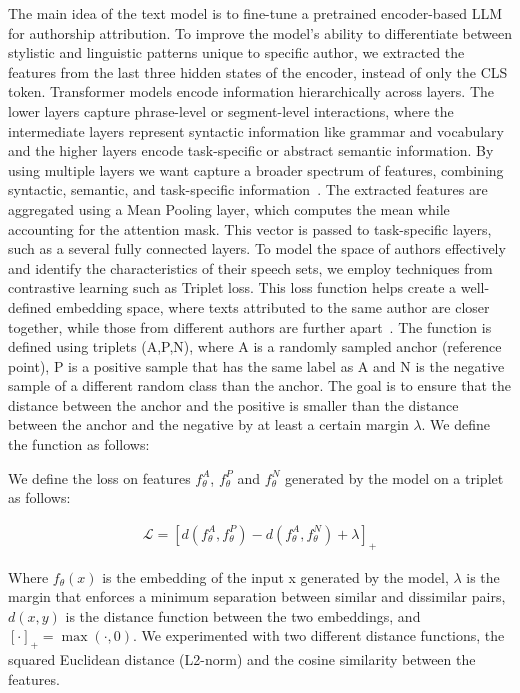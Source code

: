 \documentclass{Interspeech}
\begin{document}
The main idea of the text model is to fine-tune a pretrained encoder-based LLM
for authorship attribution. To improve the model's ability to differentiate
between stylistic and linguistic patterns unique to specific author, we
extracted the features from the last three hidden states of the encoder,
instead of only the CLS token. Transformer models encode information
hierarchically across layers. The lower layers capture phrase-level or
segment-level interactions, where the intermediate layers represent syntactic
information like grammar and vocabulary and the higher layers encode
task-specific or abstract semantic information. By using multiple layers we
want capture a broader spectrum of features, combining syntactic, semantic, and
task-specific information~\cite{jawahar2019does}. The extracted features are
aggregated using a Mean Pooling layer, which computes the mean while accounting
for the attention mask. This vector is passed to task-specific layers, such as
a several fully connected layers. To model the space of authors effectively and
identify the characteristics of their speech sets, we employ techniques from
contrastive learning such as Triplet loss. This loss function helps create a
well-defined embedding space, where texts attributed to the same author are
closer together, while those from different authors are further
apart~\cite{mao2019metric}. The function is defined using triplets (A,P,N),
where A is a randomly sampled anchor (reference point), P is a positive sample
that has the same label as A and N is the negative sample of a different random
class than the anchor. The goal is to ensure that the distance between the
anchor and the positive is smaller than the distance between the anchor and the
negative by at least a certain margin $\lambda$. We define the function as follows:

We define the loss on features $f_\theta^{A}$, $f_\theta^{P}$ and $f_\theta^{N}$ generated by the model on a triplet as follows:

\begin{align}
  \mathcal{L} = [d(f_\theta^{A},f_\theta^{P}) - d(f_\theta^{A},f_\theta^{N}) + \lambda]_{+}
  \label{eq:triplet_loss}
\end{align}


Where $f_\theta(x)$ is the embedding of the input x generated by the model,
$\lambda$ is the margin that enforces a minimum separation between similar and
dissimilar pairs, $d(x,y)$ is the distance function between the two embeddings,
and $[\cdot]_{+} = \max(\cdot, 0)$. We experimented with two different distance
functions, the squared Euclidean distance (L2-norm) and the cosine similarity
between the features.
\end{document}
